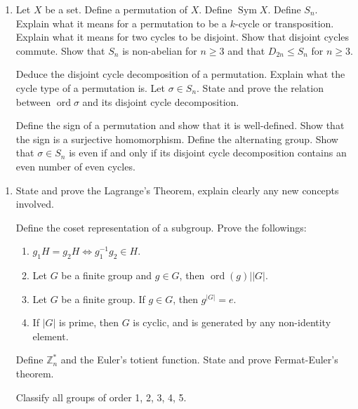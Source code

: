 \documentclass[11pt]{article}
\newlength{\qspace}
\newcounter{qnumber}
\newenvironment{question}%
 {\vspace{\qspace}
  \begin{enumerate}[\bfseries 1\quad][10]%
    \setcounter{enumi}{\value{qnumber}}%
    \item%
 }
{
  \end{enumerate}
  \filbreak
  \stepcounter{qnumber}
 }
\DeclareMathOperator{\ord}{ord}
\def\le{\leqslant}
\def\ge{\geqslant}
\begin{document}
\begin{question}
  Let $X$ be a set. Define a permutation of $X$. Define $ \operatorname{Sym}X $. Define $ S_n $. Explain what it means for a permutation to be a $k$-cycle or transposition. Explain what it means for two cycles to be disjoint. Show that disjoint cycles commute. Show that $ S_n $ is non-abelian for $ n\ge 3 $ and that $ D_{2n}\le S_n $ for $ n\ge 3 $.

  Deduce the disjoint cycle decomposition of a permutation. Explain what the cycle type of a permutation is. Let $ \sigma\in S_n $. State and prove the relation between $ \operatorname{ord}\sigma $ and its disjoint cycle decomposition.

  Define the sign of a permutation and show that it is well-defined. Show that the sign is a surjective homomorphism. Define the alternating group. Show that $ \sigma\in S_n $ is even if and only if its disjoint cycle decomposition contains an even number of even cycles.
\end{question}

\begin{question}
  State and prove the Lagrange's Theorem, explain clearly any new concepts involved.

  Define the coset representation of a subgroup. Prove the followings:
  \begin{enumerate}
    \item $ g_1H=g_2H \Longleftrightarrow g_1^{-1}g_2\in H $.
    \item Let $G$ be a finite group and $g\in G$, then $ \ord(g)||G| $.
    \item Let $G$ be a finite group. If $g\in G$, then $ g^{|G|}=e $.
    \item If $ |G| $ is prime, then $G$ is cyclic, and is generated by any non-identity element.
  \end{enumerate}
  Define $\mathbb{Z}_n^*$ and the Euler's totient function. State and prove Fermat-Euler's theorem.

  Classify all groups of order 1, 2, 3, 4, 5.
\end{question}
\end{document}
